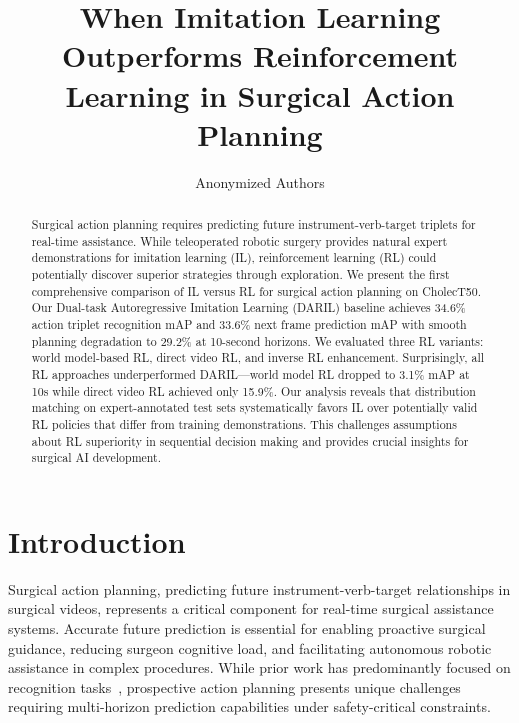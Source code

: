 \documentclass[runningheads]{llncs}
\begin{document}
%
\title{When Imitation Learning Outperforms Reinforcement Learning in Surgical Action Planning}
%
\author{Anonymized Authors}

\maketitle
%
\begin{abstract}
Surgical action planning requires predicting future instrument-verb-target triplets for real-time assistance. While teleoperated robotic surgery provides natural expert demonstrations for imitation learning (IL), reinforcement learning (RL) could potentially discover superior strategies through exploration. We present the first comprehensive comparison of IL versus RL for surgical action planning on CholecT50. Our Dual-task Autoregressive Imitation Learning (DARIL) baseline achieves 34.6\% action triplet recognition mAP and 33.6\% next frame prediction mAP with smooth planning degradation to 29.2\% at 10-second horizons. We evaluated three RL variants: world model-based RL, direct video RL, and inverse RL enhancement. Surprisingly, all RL approaches underperformed DARIL—world model RL dropped to 3.1\% mAP at 10s while direct video RL achieved only 15.9\%. Our analysis reveals that distribution matching on expert-annotated test sets systematically favors IL over potentially valid RL policies that differ from training demonstrations. This challenges assumptions about RL superiority in sequential decision making and provides crucial insights for surgical AI development.

\end{abstract}

\section{Introduction}

Surgical action planning, predicting future instrument-verb-target relationships in surgical videos, represents a critical component for real-time surgical assistance systems. Accurate future prediction is essential for enabling proactive surgical guidance, reducing surgeon cognitive load, and facilitating autonomous robotic assistance in complex procedures. While prior work has predominantly focused on recognition tasks~\cite{nwoye2022cholect50,nwoye2020recognition,nwoye2023cholectriplet2021}, prospective action planning presents unique challenges requiring multi-horizon prediction capabilities under safety-critical constraints.
\end{document}

